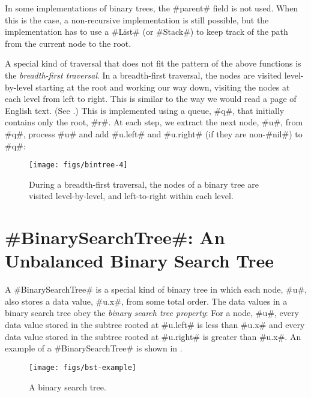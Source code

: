 In some implementations of binary trees, the #parent# field is not used.
When this is the case, a non-recursive implementation is still possible,
but the implementation has to use a #List# (or #Stack#) to keep track
of the path from the current node to the root.

A special kind of traversal that does not fit the pattern of the above
functions is the \emph{breadth-first traversal}.  In a breadth-first
traversal, the nodes are visited level-by-level starting at the root
and working our way down, visiting the nodes at each level from left
to right.  This is similar to the way we would read a page of English
text. (See .)  This is implemented using a queue, #q#,
that initially contains only the root, #r#.  At each step, we extract
the next node, #u#, from #q#, process #u# and add #u.left# and #u.right#
(if they are non-#nil#) to #q#:

\begin{figure}
  \begin{center}
    \texttt{[image: figs/bintree-4]}
  \end{center}
  \caption{During a breadth-first traversal, the nodes of a binary tree
  are visited
level-by-level, and left-to-right within each level.}
\end{figure}





\section{#BinarySearchTree#: An Unbalanced Binary Search Tree}

A #BinarySearchTree# is a special kind of binary tree in which each node, #u#,
also stores a data value, #u.x#, from some total order.  The data values in
a binary search tree obey the \emph{binary search tree property}:  For
a node, #u#, every data value stored in the subtree rooted at #u.left#
is less than #u.x# and every data value stored in the subtree rooted at
#u.right# is greater than #u.x#.  An example of a #BinarySearchTree# is shown in .

\begin{figure}
  \begin{center}
    \texttt{[image: figs/bst-example]}
  \end{center}
  \caption{A binary search tree.}
\end{figure}


